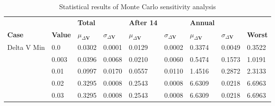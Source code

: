 \begin{table}[H]
\centering
\begin{tabular}{lllllllll}
 &  & \cellcolor[HTML]{EFEFEF}\textbf{Total} &  & \cellcolor[HTML]{EFEFEF}\textbf{After 14} & & \cellcolor[HTML]{EFEFEF}\textbf{Annual} & &\\
\rowcolor[HTML]{EFEFEF} 
\textbf{Case} & \textbf{Value} & \textbf{$\mu_{\Delta \boldsymbol{V}}$} & \textbf{$\sigma_{\Delta \boldsymbol{V}}$} & \textbf{$\mu_{\Delta \boldsymbol{V}}$} & \textbf{$\sigma_{\Delta \boldsymbol{V}}$} & \textbf{$\mu_{\Delta \boldsymbol{V}}$} & \textbf{$\sigma_{\Delta \boldsymbol{V}}$} & \textbf{Worst} \\ 
Delta V Min & 0.0 & 0.0302 & 0.0001 & 0.0129 & 0.0002 & 0.3374 & 0.0049 & 0.3522 \\ 
 & 0.003 & 0.0396 & 0.0068 & 0.0210 & 0.0060 & 0.5474 & 0.1573 & 1.0191 \\ 
 & 0.01 & 0.0997 & 0.0170 & 0.0557 & 0.0110 & 1.4516 & 0.2872 & 2.3133 \\ 
 & 0.02 & 0.3295 & 0.0008 & 0.2543 & 0.0008 & 6.6309 & 0.0218 & 6.6963 \\ 
 & 0.03 & 0.3295 & 0.0008 & 0.2543 & 0.0008 & 6.6309 & 0.0218 & 6.6963 \\ 
\end{tabular}
\caption{Statistical results of Monte Carlo sensitivity analysis}
\label{tab:SensitivityAnalysis}
\end{table}